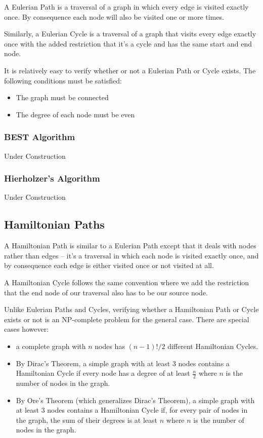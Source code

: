 A Eulerian Path is a traversal of a graph in which every edge is visited exactly once. By consequence each node will also be visited one or more times.

Similarly, a Eulerian Cycle is a traversal of a graph that visits every edge exactly once with the added restriction that it's a cycle and has the same start and end node.

It is relatively easy to verify whether or not a Eulerian Path or Cycle exists. The following conditions must be satisfied:
\begin{itemize}
\item The graph must be connected
\item The degree of each node must be even
\end{itemize}

\subsubsection{BEST Algorithm}

Under Construction

\subsubsection{Hierholzer's Algorithm}

Under Construction

\subsection{Hamiltonian Paths}
 

A Hamiltonian Path is similar to a Eulerian Path except that it deals with nodes rather than edges -- it's a traversal in which each node is visited exactly once, and by consequence each edge is either visited once or not visited at all.

A Hamiltonian Cycle follows the same convention where we add the restriction that the end node of our traversal also has to be our source node.

Unlike Eulerian Paths and Cycles, verifying whether a Hamiltonian Path or Cycle exists or not is an NP-complete problem for the general case. There are special cases however:
\begin{itemize}
\item a complete graph with $n$ nodes has $(n-1)!/2$ different Hamiltonian Cycles.
\item By Dirac's Theorem, a simple graph with at least 3 nodes contains a Hamiltonian Cycle if every node has a degree of at least $\frac{n}{2}$ where $n$ is the number of nodes in the graph.
\item By Ore's Theorem (which generalizes Dirac's Theorem), a simple graph with at least 3 nodes contains a Hamiltonian Cycle if, for every pair of nodes in the graph, the sum of their degrees is at least $n$ where $n$ is the number of nodes in the graph.
\end{itemize}